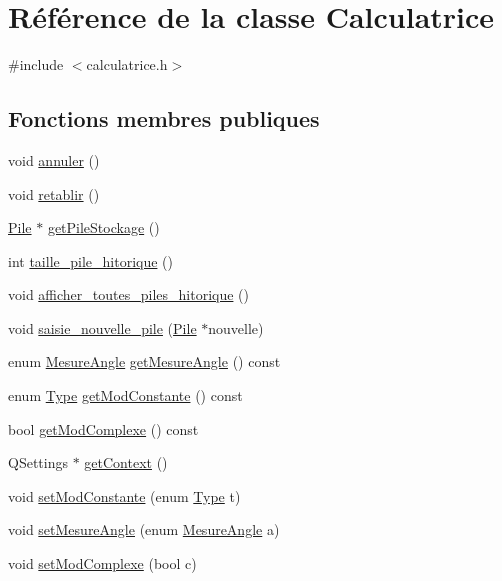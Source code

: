 \hypertarget{class_calculatrice}{\section{\-Référence de la classe \-Calculatrice}
\label{class_calculatrice}
}


{\ttfamily \#include $<$calculatrice.\-h$>$}

\subsection*{\-Fonctions membres publiques}
\begin{DoxyCompactItemize}
\item 
void \hyperlink{class_calculatrice_ae04068faaa66847c3f318c018824a277}{annuler} ()
\item 
void \hyperlink{class_calculatrice_ac9fea1beaab60d0c73c017a5d225a56c}{retablir} ()
\item 
\hyperlink{class_pile}{\-Pile} $\ast$ \hyperlink{class_calculatrice_abc998bdc47fd8e4388f2d8b03f1d9949}{get\-Pile\-Stockage} ()
\item 
int \hyperlink{class_calculatrice_a45ec794c15d65a56fb8101dd9ca4812b}{taille\-\_\-pile\-\_\-hitorique} ()
\item 
void \hyperlink{class_calculatrice_a3558f924d00e69cbfbfd7b1ee6b088a3}{afficher\-\_\-toutes\-\_\-piles\-\_\-hitorique} ()
\item 
void \hyperlink{class_calculatrice_acc6b301035c21041dbd4ffb7f6f5645e}{saisie\-\_\-nouvelle\-\_\-pile} (\hyperlink{class_pile}{\-Pile} $\ast$nouvelle)
\item 
enum \hyperlink{mainwindow_8h_ac57a15745dfbb2ebe6ba80230b7e5c6a}{\-Mesure\-Angle} \hyperlink{class_calculatrice_af2b58ecc00a772e959e166645c802cf2}{get\-Mesure\-Angle} () const 
\item 
enum \hyperlink{constante_8h_a1d1cfd8ffb84e947f82999c682b666a7}{\-Type} \hyperlink{class_calculatrice_a72d29725e5fdc334caf6b27d1b81221a}{get\-Mod\-Constante} () const 
\item 
bool \hyperlink{class_calculatrice_ad5a63f289cc5df7ccc7677ada5ca92b8}{get\-Mod\-Complexe} () const 
\item 
\-Q\-Settings $\ast$ \hyperlink{class_calculatrice_ac1fd3f178488afb8bc25dae790a9756d}{get\-Context} ()
\item 
void \hyperlink{class_calculatrice_a349cc6b05ea447fb0bde7221b560dab0}{set\-Mod\-Constante} (enum \hyperlink{constante_8h_a1d1cfd8ffb84e947f82999c682b666a7}{\-Type} t)
\item 
void \hyperlink{class_calculatrice_a51db82ce20ffafc4a6188b9f13b27fe1}{set\-Mesure\-Angle} (enum \hyperlink{mainwindow_8h_ac57a15745dfbb2ebe6ba80230b7e5c6a}{\-Mesure\-Angle} a)
\item 
void \hyperlink{class_calculatrice_ab5ad75216e44c3ca263c2706083def2b}{set\-Mod\-Complexe} (bool c)
\end{DoxyCompactItemize}

